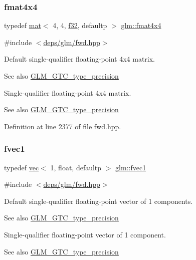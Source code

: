 \subsubsection{\texorpdfstring{fmat4x4}{fmat4x4}}
{\footnotesize\ttfamily typedef \hyperlink{structglm_1_1mat}{mat}$<$ 4, 4, \hyperlink{group__gtc__type__precision_ga0ec999b57f5330d9021256e96038df04}{f32}, defaultp $>$ \hyperlink{group__gtc__type__precision_gaeda4baa9a8e3113ff879dd5e7bdf5334}{glm\+::fmat4x4}}



{\ttfamily \#include $<$\hyperlink{fwd_8hpp}{deps/glm/fwd.\+hpp}$>$}

Default single-\/qualifier floating-\/point 4x4 matrix. \begin{DoxySeeAlso}{See also}
\hyperlink{group__gtc__type__precision}{G\+L\+M\+\_\+\+G\+T\+C\+\_\+type\+\_\+precision}
\end{DoxySeeAlso}
Single-\/qualifier floating-\/point 4x4 matrix. \begin{DoxySeeAlso}{See also}
\hyperlink{group__gtc__type__precision}{G\+L\+M\+\_\+\+G\+T\+C\+\_\+type\+\_\+precision} 
\end{DoxySeeAlso}


Definition at line 2377 of file fwd.\+hpp.

\mbox{\label{group__gtc__type__precision_gaed54853d0f184df0e5fbd9f9118c477b}} 
\subsubsection{\texorpdfstring{fvec1}{fvec1}}
{\footnotesize\ttfamily typedef \hyperlink{structglm_1_1vec}{vec}$<$ 1, float, defaultp $>$ \hyperlink{group__gtc__type__precision_gaed54853d0f184df0e5fbd9f9118c477b}{glm\+::fvec1}}



{\ttfamily \#include $<$\hyperlink{fwd_8hpp}{deps/glm/fwd.\+hpp}$>$}

Default single-\/qualifier floating-\/point vector of 1 components. \begin{DoxySeeAlso}{See also}
\hyperlink{group__gtc__type__precision}{G\+L\+M\+\_\+\+G\+T\+C\+\_\+type\+\_\+precision}
\end{DoxySeeAlso}
Single-\/qualifier floating-\/point vector of 1 component. \begin{DoxySeeAlso}{See also}
\hyperlink{group__gtc__type__precision}{G\+L\+M\+\_\+\+G\+T\+C\+\_\+type\+\_\+precision} 
\end{DoxySeeAlso}


